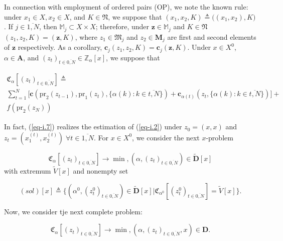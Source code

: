 \documentclass{article}
\begin{document}
In connection with employment of ordered pairs
(OP),
we note the known rule:
under
$x_1 \in X, x_2 \in X$,
and
$K \in \mathfrak N$,
we suppose that
$(x_1, x_2, K) \triangleq \big( (x_1, x_2), K\big)$.
If
$j \in \overline{1,N}$,
then
$\mathbb M_j \subset X \times X$;
therefore, under
$\mathbf z \in \mathbb M_j$
and
$K \in \mathfrak N$
$\;$
$(z_1,z_2, K)=(\mathbf z, K)$,
where
$z_1 \in \mathfrak M_j$
and
$z_2 \in \mathbf M_j$
are first and second elements of
$\mathbf z$
respectively.
As a corollary,
$\mathbf c_j(z_1, z_2, K) = \mathbf c_j(\mathbf z, K)$.
Under
$x \in X^0$,
$\alpha \in \mathbf A$,
and
$(z_t)_{t \in \overline{0,N}} \in \mathbb Z_\alpha[x]$,
we suppose that

\begin{multline}
  \label{eq-i.7}
  \mathfrak C_\alpha[(z_t)_{t \in \overline{0,N}}]
  \triangleq \\
  \sum_{t=1}^N
  \big[
    \mathbf c(
      \mathrm{pr}_2(z_{t-1}),
      \mathrm{pr}_1(z_t),
      \{ \alpha(k) : k \in \overline{t, N} \})
    +
    \mathbf c_{\alpha(t)}(z_t, \{ \alpha(k) : k \in \overline{t,N}\})
  \big]
  + \\
  f(\mathrm{pr}_2(z_N))
\end{multline}

In fact,
(\ref{eq-i.7})
realizes the estimation of (\ref{eq-i.2})
under
$z_0 = (x,x)$
and
$z_t =(x_1^{(t)}, x_2^{(t)})
\;
\forall t \in \overline{1, N}$.
For
$x \in X^0$,
we consider the next
$x$-problem

\begin{equation}
  \label{eq-i.8}
  \mathfrak C_\alpha[(z_t)_{t \in \overline{0,N}}]
  \to \min,
  (\alpha, (z_t)_{t \in \overline{0,N}}) \in \tilde{\mathbf D}[x]
\end{equation}
with extremum
$\tilde{V}[x]$
and nonempty set

\begin{equation}
  \label{eq-i.9}
  (sol)[x]
  \triangleq
  \{
    (\alpha^0, (z_t^0)_{t \in \overline{0,N}}) \in \tilde{\mathbf D}[x]
  |
    \mathfrak C_{\alpha^0}[(z_t^0)_{t \in \overline{0,N}}] = \tilde{V}[x]
  \}.
\end{equation}

Now, we consider tje next complete problem:

\begin{equation}
  \label{eq-i.10}
  \mathfrak C_\alpha[(z_t)_{t \in \overline{0,N}}]
  \to \min,
  (\alpha, (z_t)_{t \in \overline{0,N}}, x) \in \mathbf D.
\end{equation}
\end{document}
